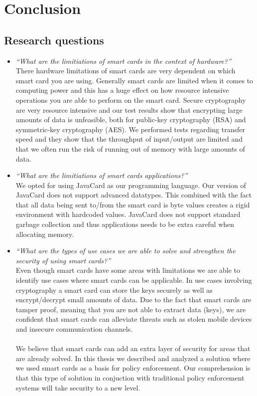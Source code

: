 \chapter{Conclusion}
\label{ch:conclusion}

\section{Research questions}
\begin{itemize}
  \item \textit{``What are the limitiations of smart cards in the context of hardware?''}\\
  There hardware limitations of smart cards are very dependent on which smart card you are using. Generally smart cards are limited when it comes to computing power and this has a huge effect on how resource intensive operations you are able to perform on the smart card. Secure cryptography are very resource intensive and our test results show that encrypting large amounts of data is unfeasible, both for public-key cryptography (RSA) and symmetric-key cryptography (AES). We performed tests regarding transfer speed and they show that the throughput of input/output are limited and that we often run the risk of running out of memory with large amounts of data.
  \item \textit{``What are the limitiations of smart cards applications?''}\\
  We opted for using JavaCard as our programming language. Our version of JavaCard does not support advanced datatypes. This combined with the fact that all data being sent to/from the smart card is byte values creates a rigid environment with hardcoded values. JavaCard does not support standard garbage collection and thus applications needs to be extra careful when allocating memory.
  \item \textit{``What are the types of use cases we are able to solve and strengthen the security of using smart cards?''}\\
  Even though smart cards have some areas with limitations we are able to identify use cases where smart cards can be applicable. In use cases involving cryptography a smart card can store the keys securely as well as encrypt/decrypt small amounts of data. Due to the fact that smart cards are tamper proof, meaning that you are not able to extract data (keys), we are confident that smart cards can alleviate threats such as stolen mobile devices and insecure communication channels.\mbox{}\\\\  We believe that smart cards can add an extra layer of security for areas that are already solved. In this thesis we described and analyzed a solution where we used smart cards as a basis for policy enforcement. Our comprehension is that this type of solution in conjuction with traditional policy enforcement systems will take security to a new level.
\end{itemize}

